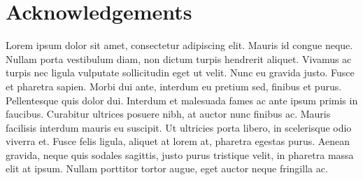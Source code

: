 
\newpage
\null
\vfill
\section*{Acknowledgements} Lorem ipsum dolor sit amet, consectetur adipiscing elit. Mauris id congue neque. Nullam porta vestibulum diam, non dictum turpis hendrerit aliquet. Vivamus ac turpis nec ligula vulputate sollicitudin eget ut velit. Nunc eu gravida justo. Fusce et pharetra sapien. Morbi dui ante, interdum eu pretium sed, finibus et purus. Pellentesque quis dolor dui. Interdum et malesuada fames ac ante ipsum primis in faucibus. Curabitur ultrices posuere nibh, at auctor nunc finibus ac. Mauris facilisis interdum mauris eu suscipit. Ut ultricies porta libero, in scelerisque odio viverra et. Fusce felis ligula, aliquet at lorem at, pharetra egestas purus. Aenean gravida, neque quis sodales sagittis, justo purus tristique velit, in pharetra massa elit at ipsum. Nullam porttitor tortor augue, eget auctor neque fringilla ac.

